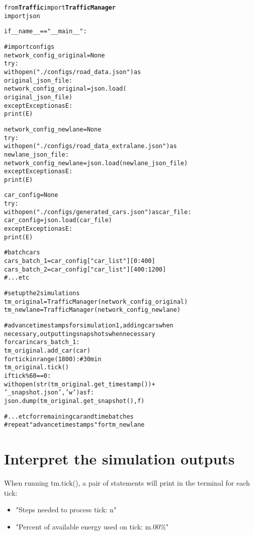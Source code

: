\begin{alltt}
from \textbf{Traffic} import \textbf{TrafficManager}
import json

if __name__ == "__main__":

    # import configs
    network_config_original = None
    try:
        with open("./configs/road_data.json") as 
                  original_json_file: 
            network_config_original = json.load(
                                      original_json_file)
    except Exception as E:
        print(E)
        
    network_config_newlane = None
    try:
        with open("./configs/road_data_extralane.json") as 
                  newlane_json_file: 
            network_config_newlane = json.load(newlane_json_file)
    except Exception as E:
        print(E)

    car_config = None
    try:
        with open("./configs/generated_cars.json") as car_file:  
            car_config = json.load(car_file)
    except Exception as E:
        print(E)
        
    # batch cars
    cars_batch_1 = car_config["car_list"][0:400]
    cars_batch_2 = car_config["car_list"][400:1200]
    # ...etc
    
    # set up the 2 simulations
    tm_original = TrafficManager(network_config_original)
    tm_newlane = TrafficManager(network_config_newlane)
    
    # advance timestamps for simulation 1, adding cars when 
           necessary, outputting snapshots when necessary
    for car in cars_batch_1:
        tm_original.add_car(car)
    for tick in range(1800):     # 30 min
        tm_original.tick()
        if tick \% 60 == 0:
            with open(str(tm_original.get_timestamp()) + 
                          '_snapshot.json', 'w') as f:
                json.dump(tm_original.get_snapshot(), f)
    
    # ...etc for remaining car and time batches
    #  repeat "advance timestamps" for tm_newlane
\end{alltt}


\section{Interpret the simulation outputs}

\par When running tm.tick(), a pair of statements will print in the terminal for each tick:

\begin{itemize}
    \item "Steps needed to process tick:  n"
    \item "Percent of available energy used on tick:  m.00\%"
\end{itemize}

